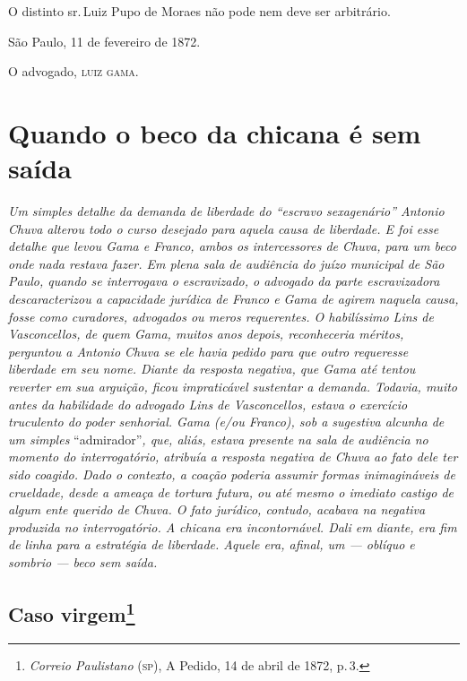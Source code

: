 O distinto sr.\,Luiz Pupo de Moraes não pode nem deve ser arbitrário.

São Paulo, 11 de fevereiro de 1872.

O advogado, \textsc{luiz gama}.

\part{Quando o beco da chicana é sem saída}

\begin{argumento}
\emph{Um simples detalhe da demanda de liberdade do ``escravo
sexagenário'' Antonio Chuva alterou todo o curso desejado para aquela
causa de liberdade. E foi esse detalhe que levou Gama e Franco, ambos os
intercessores de Chuva, para um beco onde nada restava fazer. Em plena
sala de audiência do juízo municipal de São Paulo, quando se interrogava
o escravizado, o advogado da parte escravizadora descaracterizou a
capacidade jurídica de Franco e Gama de agirem naquela causa, fosse como
curadores, advogados ou meros requerentes. O habilíssimo Lins de
Vasconcellos, de quem Gama, muitos anos depois, reconheceria méritos,
perguntou a Antonio Chuva se ele havia pedido para que outro requeresse
liberdade em seu nome. Diante da resposta negativa, que Gama até tentou
reverter em sua arguição, ficou impraticável sustentar a demanda.
Todavia, muito antes da habilidade do advogado Lins de Vasconcellos,
estava o exercício truculento do poder senhorial. Gama (e/ou Franco),
sob a sugestiva alcunha de um simples} ``admirador''\emph{, que, aliás,
estava presente na sala de audiência no momento do interrogatório,
atribuía a resposta negativa de Chuva ao fato dele ter sido coagido.
Dado o contexto, a coação poderia assumir formas inimagináveis de
crueldade, desde a ameaça de tortura futura, ou até mesmo o imediato
castigo de algum ente querido de Chuva. O fato jurídico, contudo,
acabava na negativa produzida no interrogatório. A chicana era
incontornável. Dali em diante, era fim de linha para a estratégia de
liberdade. Aquele era, afinal, um --- oblíquo e sombrio --- beco sem
saída.}
\end{argumento}

\chapter{Caso virgem\footnote{\emph{Correio Paulistano} (\textsc{sp}), A Pedido, 14 de abril de 1872,
  p.\,3.}} %

